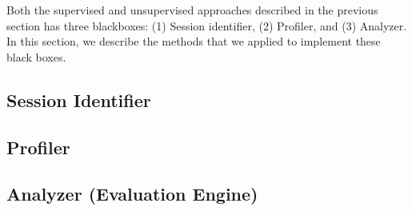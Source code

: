 


Both the supervised and unsupervised approaches described in the previous section has three blackboxes: (1) Session identifier, (2) Profiler, and (3) Analyzer. In this section, we describe the methods that we applied to implement these black boxes.

\subsection{Session Identifier}
\label{sec:sessionidentifier}


\subsection{Profiler}
\label{sec:profiler}


\subsection{Analyzer (Evaluation Engine)}
\label{sec:analyzer}

